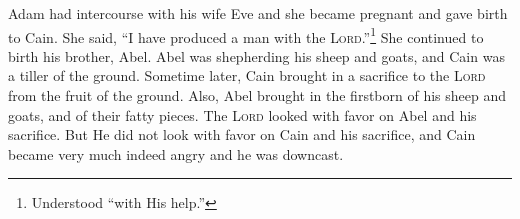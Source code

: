 
\begin{inparaenum}
     Adam had intercourse with his wife Eve and she became pregnant and gave birth to Cain. She said, ``I have produced a man with the \textsc{Lord}.''\footnote{Understood ``with His help.''}%
     She continued to birth his brother, Abel. Abel was shepherding his sheep and goats, and Cain was a tiller of the ground.%
     Sometime later, Cain brought in a sacrifice to the \textsc{Lord} from the fruit of the ground.%
     Also, Abel brought in the firstborn of his sheep and goats, and of their fatty pieces. The \textsc{Lord} looked with favor on Abel and his sacrifice.%
     But He did not look with favor on Cain and his sacrifice, and Cain became very much indeed angry and he was downcast.%
    
    
    
\end{inparaenum}
